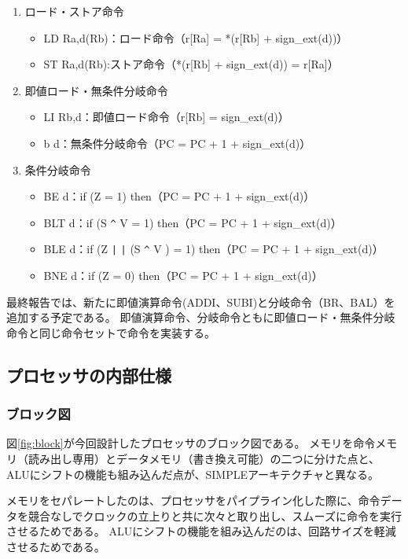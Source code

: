 \documentclass[titlepage]{jsarticle}
\begin{document}
\begin{enumerate}
\begin{itemize}
\end{itemize}
\item ロード・ストア命令
\begin{itemize}
\item LD Ra,d(Rb)：ロード命令（r[Ra] = *(r[Rb] + sign\_ext(d))）
\item ST Ra,d(Rb):ストア命令（*(r[Rb] + sign\_ext(d)) = r[Ra]）
\end{itemize}
\item 即値ロード・無条件分岐命令
\begin{itemize}
\item LI Rb,d：即値ロード命令（r[Rb] = sign\_ext(d)）
\item b d：無条件分岐命令（PC = PC + 1 + sign\_ext(d)）
\end{itemize}
\item 条件分岐命令
\begin{itemize}
\item BE d：if (Z = 1) then（PC = PC + 1 + sign\_ext(d)）
\item BLT d：if (S \verb|^| V = 1) then（PC = PC + 1 + sign\_ext(d)）
\item BLE d：if (Z \verb+|+ \verb+|+ (S \verb|^| V ) = 1) then（PC = PC + 1 + sign\_ext(d)）
\item BNE d：if (Z = 0) then（PC = PC + 1 + sign\_ext(d)）
\end{itemize}
\end{enumerate}

最終報告では、新たに即値演算命令(ADDI、SUBI)と分岐命令（BR、BAL）を追加する予定である。
即値演算命令、分岐命令ともに即値ロード・無条件分岐命令と同じ命令セットで命令を実装する。

\subsection{プロセッサの内部仕様}

\subsubsection{ブロック図}

図\ref{fig:block}が今回設計したプロセッサのブロック図である。
メモリを命令メモリ（読み出し専用）とデータメモリ（書き換え可能）の二つに分けた点と、ALUにシフトの機能も組み込んだ点が、SIMPLEアーキテクチャと異なる。

メモリをセパレートしたのは、プロセッサをパイプライン化した際に、命令データを競合なしでクロックの立上りと共に次々と取り出し、スムーズに命令を実行させるためである。
ALUにシフトの機能を組み込んだのは、回路サイズを軽減させるためである。
\end{document}
